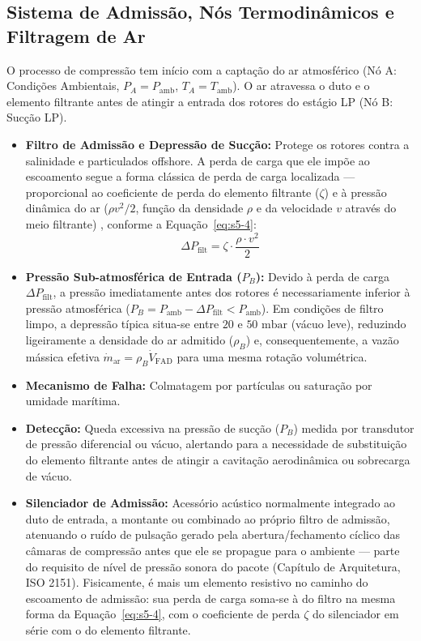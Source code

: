 \documentclass[12pt,a4paper]{article}
\numberwithin{equation}{section}
\numberwithin{table}{section}
\numberwithin{figure}{section}
\begin{document}
	\subsection{\textbf{Sistema de Admissão, Nós Termodinâmicos e Filtragem de Ar}}
	O processo de compressão tem início com a captação do ar atmosférico (Nó A: Condições Ambientais, $P_A = P_{\text{amb}}$, $T_A = T_{\text{amb}}$). O ar atravessa o duto e o elemento filtrante antes de atingir a entrada dos rotores do estágio LP (Nó B: Sucção LP).
	\begin{itemize}
		\item \textbf{Filtro de Admissão e Depressão de Sucção:} Protege os rotores contra a salinidade e particulados offshore. A perda de carga que ele impõe ao escoamento segue a forma clássica de perda de carga localizada — proporcional ao coeficiente de perda do elemento filtrante ($\zeta$) e à pressão dinâmica do ar ($\rho v^2/2$, função da densidade $\rho$ e da velocidade $v$ através do meio filtrante) \cite{white}, conforme a Equação~\eqref{eq:s5-4}:
		\begin{equation}\label{eq:s5-4}
 \Delta P_{\text{filt}} = \zeta \cdot \frac{\rho \cdot v^2}{2}
\end{equation}
		\item \textbf{Pressão Sub-atmosférica de Entrada ($P_B$):} Devido à perda de carga $\Delta P_{\text{filt}}$, a pressão imediatamente antes dos rotores é necessariamente inferior à pressão atmosférica ($P_B = P_{\text{amb}} - \Delta P_{\text{filt}} < P_{\text{amb}}$). Em condições de filtro limpo, a depressão típica situa-se entre $20$ e $50\text{ mbar}$ (vácuo leve), reduzindo ligeiramente a densidade do ar admitido ($\rho_B$) e, consequentemente, a vazão mássica efetiva $\dot{m}_{\text{ar}} = \rho_B \dot{V}_{\text{FAD}}$ para uma mesma rotação volumétrica.
		\item \textbf{Mecanismo de Falha:} Colmatagem por partículas ou saturação por umidade marítima.
		\item \textbf{Detecção:} Queda excessiva na pressão de sucção ($P_B$) medida por transdutor de pressão diferencial ou vácuo, alertando para a necessidade de substituição do elemento filtrante antes de atingir a cavitação aerodinâmica ou sobrecarga de vácuo.
		\item \textbf{Silenciador de Admissão:} Acessório acústico normalmente integrado ao duto de entrada, a montante ou combinado ao próprio filtro de admissão, atenuando o ruído de pulsação gerado pela abertura/fechamento cíclico das câmaras de compressão antes que ele se propague para o ambiente — parte do requisito de nível de pressão sonora do pacote (Capítulo de Arquitetura, ISO 2151). Fisicamente, é mais um elemento resistivo no caminho do escoamento de admissão: sua perda de carga soma-se à do filtro na mesma forma da Equação~\eqref{eq:s5-4}, com o coeficiente de perda $\zeta$ do silenciador em série com o do elemento filtrante.
	\end{itemize}
\end{document}

